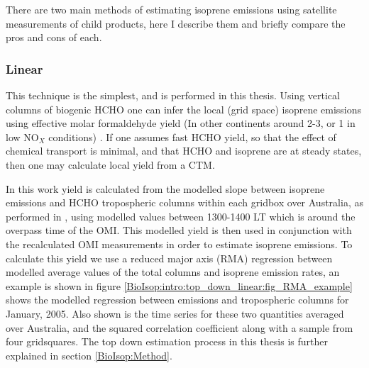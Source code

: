     There are two main methods of estimating isoprene emissions using satellite measurements of child products, here I describe them and briefly compare the pros and cons of each.
    
    \subsubsection{Linear}
      \label{BioIsop:intro:top_down_linear}
      
      This technique is the simplest, and is performed in this thesis.
      Using vertical columns of biogenic HCHO one can infer the local (grid space) isoprene emissions using effective molar formaldehyde yield (In other continents around 2-3, or 1 in low NO$_X$ conditions) \parencite{Palmer2003,Marais2012,Bauwens2016}.
      If one assumes fast HCHO yield, so that the effect of chemical transport is minimal, and that HCHO and isoprene are at steady states, then one may calculate local yield from a CTM.
      
      In this work yield is calculated from the modelled slope between isoprene emissions and HCHO tropospheric columns within each gridbox over Australia, as performed in \textcite{Palmer2003}, using modelled values between 1300-1400 LT which is around the overpass time of the OMI.
      This modelled yield is then used in conjunction with the recalculated OMI measurements in order to estimate isoprene emissions.
      To calculate this yield we use a reduced major axis (RMA) regression between modelled average values of the total columns and isoprene emission rates, an example is shown in figure \ref{BioIsop:intro:top_down_linear:fig_RMA_example} shows the modelled regression between emissions and tropospheric columns for January, 2005. Also shown is the time series for these two quantities averaged over Australia, and the squared correlation coefficient along with a sample from four gridsquares.
      The top down estimation process in this thesis is further explained in section \ref{BioIsop:Method}.
      
        {\label{BioIsop:intro:top_down_linear:fig_RMA_example}}
      

